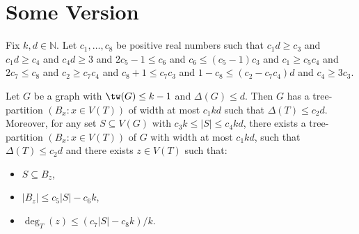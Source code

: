 \section{Some Version}

\begin{lem}
Fix $k,d\in\mathbb{N}$. 
Let $c_1,\dots,c_8$ be positive real numbers such that $c_1d \geq c_3$ and $c_1d\geq c_4$ and $c_4 d\geq 3$ and $2 c_5-1 \leq c_6 $ and 
$c_6 \leq (c_5-1) c_3$ and $c_1\geq c_5c_4$ and $2c_7  \leq  c_8$ and
$c_2 \geq c_7c_4$ and $c_8+1 \leq c_7 c_3  $ and 
$1- c_8  \leq (c_2-c_7 c_4)d$ and $ c_4 \geq 3c_3$. 


Let $G$ be a graph with $\tw(G)\leq k-1$ and $\Delta(G)\leq d$.
Then $G$ has a tree-partition $(B_x:x\in V(T))$ of width at most $c_1kd$ such that $\Delta(T)\leq c_2 d$. 
Moreover, for any set $S\subseteq V(G)$ with $c_3 k\leq|S| \leq c_4 kd$, there exists a tree-partition $(B_x:x\in V(T))$ of $G$ with width at most $c_1 kd$, such that $\Delta(T)\leq c_2d$ and there exists $z\in V(T)$ such that:
\begin{itemize}
    \item $S\subseteq B_z$, 
    \item $|B_z|\leq c_5|S|-c_6k$,
    \item $\deg_T(z)\leq ( c_7 |S| - c_8 k)/k$.
\end{itemize}
\end{lem}

